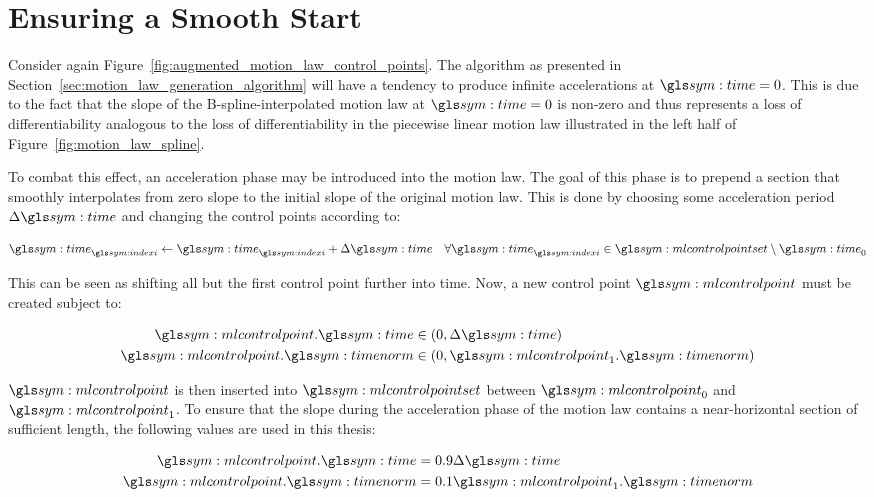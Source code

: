 \section{Ensuring a Smooth Start}%
\label{sec:ensuring_a_smooth_start}

	Consider again Figure~\ref{fig:augmented_motion_law_control_points}. The
	algorithm as presented in Section~\ref{sec:motion_law_generation_algorithm}
	will have a tendency to produce infinite accelerations at $\timesym = 0$.
	This is due to the fact that the slope of the B-spline-interpolated motion
	law at $\timesym = 0$ is non-zero and thus represents a loss of
	differentiability analogous to the loss of differentiability in the
	piecewise linear motion law illustrated in the left half of
	Figure~\ref{fig:motion_law_spline}.

	To combat this effect, an acceleration phase may be introduced into the
	motion law. The goal of this phase is to prepend a section that smoothly
	interpolates from zero slope to the initial slope of the original motion
	law. This is done by choosing some acceleration period $\Delta\timesym$ and
	changing the control points according to:

	\begin{equation}
		\timesym_{\indexi} \gets \timesym_{\indexi} + \Delta\timesym
			\quad\forall\timesym_{\indexi} \in \mlcontrolpointset \setminus \timesym_0
	\end{equation}

	This can be seen as shifting all but the first control point further into
	time. Now, a new control point $\mlcontrolpoint$ must be created subject to:

	\begin{align}
		\begin{split}
			\mlcontrolpoint.\timesym &\in (0, \Delta\timesym)\\
			\mlcontrolpoint.\timenorm &\in (0, \mlcontrolpoint_1.\timenorm)
		\end{split}
	\end{align}

	$\mlcontrolpoint$ is then inserted into $\mlcontrolpointset$ between
	$\mlcontrolpoint_0 $ and $\mlcontrolpoint_1$. To ensure that the slope
	during the acceleration phase of the motion law contains a near-horizontal
	section of sufficient length, the following values are used in this thesis:

	\begin{align}
		\begin{split}
			\mlcontrolpoint.\timesym &= 0.9\Delta\timesym\\
			\mlcontrolpoint.\timenorm &= 0.1\mlcontrolpoint_1.\timenorm
		\end{split}
	\end{align}


